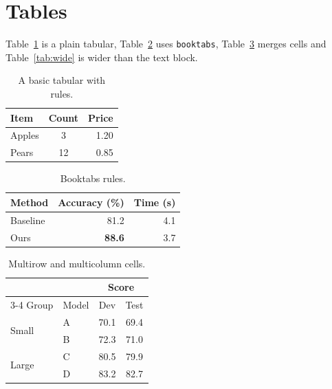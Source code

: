 \documentclass[11pt]{article}
\begin{document}
\section{Tables}
Table~\ref{tab:basic} is a plain tabular, Table~\ref{tab:booktabs} uses \texttt{booktabs},
Table~\ref{tab:merged} merges cells and Table~\ref{tab:wide} is wider than the text block.

\begin{table}[H]
  \centering
  \caption{A basic tabular with rules.}
  \label{tab:basic}
  \begin{tabular}{|l|c|r|}
    \hline
    Item & Count & Price \\ \hline
    Apples & 3 & 1.20 \\
    Pears & 12 & 0.85 \\ \hline
  \end{tabular}
\end{table}

\begin{table}[htbp]
  \centering
  \caption{Booktabs rules.}
  \label{tab:booktabs}
  \begin{tabular}{lrr}
    \toprule
    Method & Accuracy (\%) & Time (s) \\
    \midrule
    Baseline & 81.2 & 4.1 \\
    Ours & \textbf{\color{teal}88.6} & 3.7 \\
    \bottomrule
  \end{tabular}
\end{table}

\begin{table}[htbp]
  \centering
  \caption{Multirow and multicolumn cells.}
  \label{tab:merged}
  \begin{tabular}{llcc}
    \toprule
    & & \multicolumn{2}{c}{Score} \\
    \cmidrule(lr){3-4}
    Group & Model & Dev & Test \\
    \midrule
    \multirow{2}{*}{Small} & A & 70.1 & 69.4 \\
                           & B & 72.3 & 71.0 \\
    \multirow{2}{*}{Large} & C & 80.5 & 79.9 \\
                           & D & 83.2 & 82.7 \\
    \bottomrule
  \end{tabular}
\end{table}

\begin{table}[htbp]
  \centering
  \caption{A wide table shrunk to the line width.}
  \label{tab:wide}
\end{table}
\end{document}
